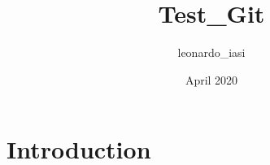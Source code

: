 \documentclass{article}
\title{Test_Git}
\author{leonardo_iasi }
\date{April 2020}
\begin{document}
\maketitle

\section{Introduction}
\end{document}
